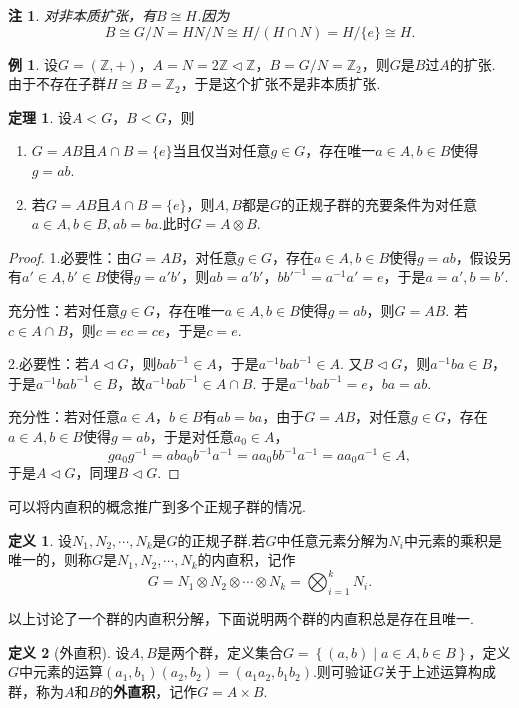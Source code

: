 \documentclass[12pt]{ctexart}
\theoremstyle{definition}
\newtheorem{definition}{定义}[section]
\newtheorem{theorem}{定理}[section]
\newtheorem{example}{例}[section]
\theoremstyle{plain}
\newtheorem*{remark}{注}
\begin{document}
\begin{remark}
	对非本质扩张，有$B\cong H$.因为
	$$B\cong G/N=HN/N\cong H/(H\cap N)=H/\{e\}\cong H.$$
\end{remark}
\begin{example}
	设$G=(\mathbb{Z},+)$，$A=N=2\mathbb{Z}\lhd\mathbb{Z}$，$B=G/N=\mathbb{Z}_2$，则$G$是$B$过$A$的扩张. 由于不存在子群$H\cong B=\mathbb{Z}_2$，于是这个扩张不是非本质扩张.
\end{example}
\begin{theorem}
	设$A<G$，$B<G$，则
	\begin{enumerate}
		\item $G=AB$且$A\cap B=\{e\}$当且仅当对任意$g\in G$，存在唯一$a\in A,b\in B$使得$g=ab$.
		\item 若$G=AB$且$A\cap B=\{e\}$，则$A,B$都是$G$的正规子群的充要条件为对任意$a\in A,b\in B,ab=ba$.此时$G=A\otimes B$.
	\end{enumerate}
\end{theorem}
\begin{proof}
	1.必要性：由$G=AB$，对任意$g\in G$，存在$a\in A,b\in B$使得$g=ab$，假设另有$a'\in A,b'\in B$使得$g=a'b'$，则$ab=a'b'$，$bb'^{-1}=a^{-1}a'=e$，于是$a=a',b=b'$.
	
	充分性：若对任意$g\in G$，存在唯一$a\in A,b\in B$使得$g=ab$，则$G=AB$. 若$c\in A\cap B$，则$c=ec=ce$，于是$c=e$.
	
	2.必要性：若$A\lhd G$，则$bab^{-1}\in A$，于是$a^{-1}bab^{-1}\in A$. 又$B\lhd G$，则$a^{-1}ba\in B$，于是$a^{-1}bab^{-1}\in B$，故$a^{-1}bab^{-1}\in A\cap B$. 于是$a^{-1}bab^{-1}=e$，$ba=ab$.
	
	充分性：若对任意$a\in A$，$b\in B$有$ab=ba$，由于$G=AB$，对任意$g\in G$，存在$a\in A,b\in B$使得$g=ab$，于是对任意$a_0\in A$，
	$$ga_0g^{-1}=aba_0b^{-1}a^{-1}=aa_0bb^{-1}a^{-1}=aa_0a^{-1}\in A,$$
	于是$A\lhd G$，同理$B\lhd G$.
\end{proof}
可以将内直积的概念推广到多个正规子群的情况.
\begin{definition}
	设$N_1,N_2,\cdots,N_k$是$G$的正规子群.若$G$中任意元素分解为$N_i$中元素的乘积是唯一的，则称$G$是$N_1,N_2,\cdots,N_k$的内直积，记作
	$$G=N_1\otimes N_2\otimes\cdots\otimes N_k=\bigotimes_{i=1}^{k}N_i.$$
\end{definition}
以上讨论了一个群的内直积分解，下面说明两个群的内直积总是存在且唯一.
\begin{definition}[外直积]
	设$A,B$是两个群，定义集合$G=\left\{(a,b)\mid a\in A,b\in B\right\}$，定义$G$中元素的运算$(a_1,b_1)(a_2,b_2)=(a_1a_2,b_1b_2)$.则可验证$G$关于上述运算构成群，称为$A$和$B$的\textbf{外直积}，记作$G=A\times B$.
\end{definition}
\end{document}
